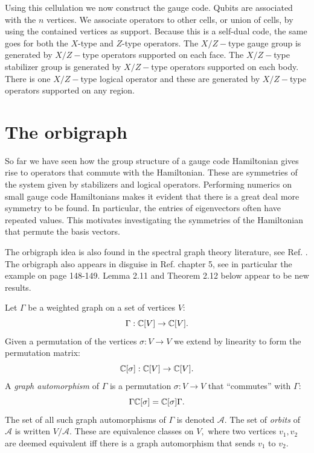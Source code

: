 Using this cellulation we now construct the gauge code.
Qubits are associated with the $n$ vertices.
We associate operators to other cells, or union of cells,
by using the contained vertices as support.
Because this is a self-dual code, the same goes for
both the $X$-type and $Z$-type operators.
The $X/Z-$type gauge group is generated by
$X/Z-$type operators supported on each face.
The $X/Z-$type stabilizer group is generated by
$X/Z-$type operators supported on each body.
There is one $X/Z-$type logical operator and these
are generated by
$X/Z-$type operators supported on any region.

%


\section{The orbigraph}

So far we have seen how the group structure of a gauge code 
Hamiltonian gives rise to operators that commute with
the Hamiltonian. These are symmetries of the system given
by stabilizers and logical operators.
Performing numerics on small gauge code Hamiltonians makes
it evident that there is a great deal more symmetry to be found.
In particular, the entries of eigenvectors 
often have repeated values.
This motivates investigating the symmetries of the 
Hamiltonian that permute the basis vectors.

The orbigraph idea is also found in the
spectral graph theory literature, see Ref. \cite{Daly2017}.
The orbigraph also appears in disguise in Ref. \cite{Cvetkovic1980} chapter 5, 
see in particular the example on page 148-149.
Lemma 2.11 and Theorem 2.12 below appear to be new results.

\def\auto{\mathcal{A}}

Let $\Gamma$ be a weighted graph on a set of vertices $V$:
$$
    \Gamma : \mathbb{C}[V] \to \mathbb{C}[V].
$$
Given a permutation of the vertices $\sigma:V\to V$ we
extend by linearity to form the permutation matrix:
$$
    \mathbb{C}[\sigma] : \mathbb{C}[V] \to \mathbb{C}[V].
$$
A \emph{graph automorphism} of $\Gamma$ is a permutation
$\sigma:V\to V$ that ``commutes'' with $\Gamma:$
$$
    \Gamma \mathbb{C}[\sigma] = \mathbb{C}[\sigma] \Gamma.
$$
The set of all such graph automorphisms of $\Gamma$ is denoted $\auto$.
The set of \emph{orbits} of $\auto$ is written $ V / \auto.$
These are equivalence classes on $V,$ where two vertices $v_1, v_2$ are
deemed equivalent iff there is a graph automorphism that sends $v_1$ to $v_2.$

